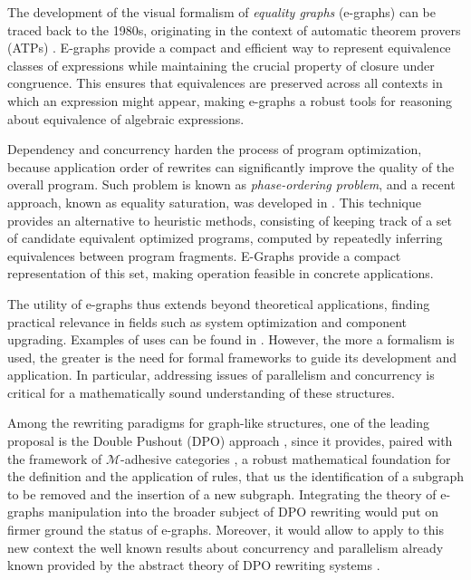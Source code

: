 The development of the visual formalism of \emph{equality graphs} (e-graphs) can be traced back to the 1980s, originating in the context of automatic theorem provers (ATPs) \cite{Nelson1980}. 
E-graphs provide a compact and efficient way to represent equivalence classes of expressions while maintaining the crucial property of closure under congruence. 
This ensures that equivalences are preserved across all contexts in which an expression might appear, making e-graphs a robust tools for reasoning about equivalence of algebraic expressions.

Dependency and concurrency harden the process of program optimization, because application order of rewrites can significantly improve the quality of the overall program.
Such problem is known as \textit{phase-ordering problem}, and a recent approach, known as equality saturation, was developed in \cite{Tate_2011}.
This technique provides an alternative to heuristic methods, consisting of keeping track of a set of candidate equivalent optimized programs, 
computed by repeatedly inferring equivalences between program fragments.
E-Graphs provide a compact representation of this set, making operation feasible in concrete applications.

The utility of e-graphs thus extends beyond theoretical applications, finding practical relevance in fields such as system optimization and component upgrading. Examples of uses can be found in \cite{Cheli2021}.
%
However, the more a formalism is used, the greater is the need for formal frameworks to guide its development and application. In particular, addressing issues of parallelism and concurrency is critical for 
a mathematically 
sound understanding of these structures.

Among the rewriting paradigms for graph-like structures, one of the leading proposal is the Double Pushout (DPO) approach \cite{Ehrig_Golas,ehrig2006fundamentals}, since it provides, paired with the framework of $\mathcal{M}$-adhesive  categories \cite{lack2005adhesive,azzi2019essence,behr2022fundamentals}, a robust mathematical foundation for the definition and the application of rules,
that us the identification of a subgraph to be removed and the insertion of a new subgraph.
%
Integrating the theory of e-graphs manipulation into the broader subject of DPO rewriting would put on firmer ground the status of e-graphs. Moreover, it would allow to apply to this new context the well known results about concurrency and parallelism already known provided by the abstract theory of DPO rewriting systems \cite{baldan1999concurrent,ehrig1999handbook}. 
 
